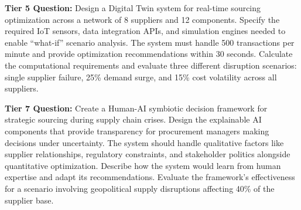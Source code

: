 \documentclass{article}
\begin{document}
\textbf{Tier 5 Question:}
Design a Digital Twin system for real-time sourcing optimization across a network of 8 suppliers and 12 components. Specify the required IoT sensors, data integration APIs, and simulation engines needed to enable ``what-if'' scenario analysis. The system must handle 500 transactions per minute and provide optimization recommendations within 30 seconds. Calculate the computational requirements and evaluate three different disruption scenarios: single supplier failure, 25\% demand surge, and 15\% cost volatility across all suppliers.

\textbf{Tier 7 Question:}
Create a Human-AI symbiotic decision framework for strategic sourcing during supply chain crises. Design the explainable AI components that provide transparency for procurement managers making decisions under uncertainty. The system should handle qualitative factors like supplier relationships, regulatory constraints, and stakeholder politics alongside quantitative optimization. Describe how the system would learn from human expertise and adapt its recommendations. Evaluate the framework's effectiveness for a scenario involving geopolitical supply disruptions affecting 40\% of the supplier base.
\end{document}
